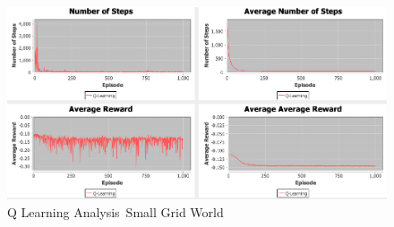\documentclass[11pt]{article}
\newcommand{\problemone}{Small Grid World}
\begin{document}
    \begin{figure}
        \begin{minipage}{1\textwidth}
            \centering
            \includegraphics[width=1\linewidth]{qlearningdeepdive.png}
            \caption{Q Learning Analysis~\problemone}\label{Fig:Q-Learning DD~\problemone}
        \end{minipage}
    \end{figure}
\end{document}
